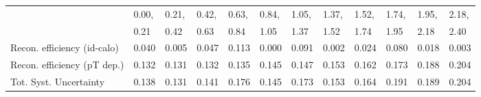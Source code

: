 \begin{tabular}{l|p{0.6cm}p{0.6cm}p{0.6cm}p{0.6cm}p{0.6cm}p{0.6cm}p{0.6cm}p{0.6cm}p{0.6cm}p{0.6cm}p{0.6cm}}
\hline
   & 0.00, & 0.21, & 0.42, & 0.63, & 0.84, & 1.05, & 1.37, & 1.52, & 1.74, & 1.95, & 2.18,  \\ 
   & 0.21 & 0.42 & 0.63 & 0.84 & 1.05 & 1.37 & 1.52 & 1.74 & 1.95 & 2.18 & 2.40  \\ 
\hline
Recon. efficiency (id-calo)              & 0.040 & 0.005 & 0.047 & 0.113 & 0.000 & 0.091 & 0.002 & 0.024 & 0.080 & 0.018 & 0.003 \\
\hline
Recon. efficiency (pT dep.)              & 0.132 & 0.131 & 0.132 & 0.135 & 0.145 & 0.147 & 0.153 & 0.162 & 0.173 & 0.188 & 0.204 \\
\hline
Tot. Syst. Uncertainty                   & 0.138 & 0.131 & 0.141 & 0.176 & 0.145 & 0.173 & 0.153 & 0.164 & 0.191 & 0.189 & 0.204 \\
\hline
\end{tabular}
